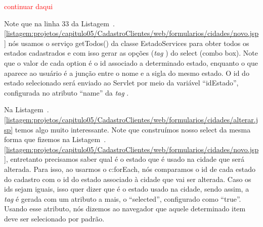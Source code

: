  


\textcolor{red}{continuar daqui}

Note que na linha 33 da Listagem~\thechapter.\ref{listagem:projetos/capitulo05/CadastroClientes/web/formularios/cidades/novo.jsp} nós usamos o serviço getTodos() da classe EstadoServices para obter todos os estados cadastrados e com isso gerar as opções (\textit{tag} ) do select (combo box). Note que o valor de cada option é o id associado a determinado estado, enquanto o que aparece ao usuário é a junção entre o nome e a sigla do mesmo estado. O id do estado selecionado será enviado ao Servlet por meio da variável ``idEstado'', configurada no atributo ``name'' da \textit{tag} .



Na Listagem~\thechapter.\ref{listagem:projetos/capitulo05/CadastroClientes/web/formularios/cidades/alterar.jsp} temos algo muito interessante. Note que construímos nosso select da mesma forma que fizemos na Listagem~\thechapter.\ref{listagem:projetos/capitulo05/CadastroClientes/web/formularios/cidades/novo.jsp}, entretanto precisamos saber qual é o estado que é usado na cidade que será alterada. Para isso, ao usarmos o c:forEach, nós comparamos o id de cada estado do cadastro com o id do estado associado à cidade que vai ser alterada. Caso os ids sejam iguais, isso quer dizer que é o estado usado na cidade, sendo assim, a \textit{tag}  é gerada com um atributo a mais, o ``selected'', configurado como ``true''. Usando esse atributo, nós dizemos ao navegador que aquele determinado item deve ser selecionado por padrão.


